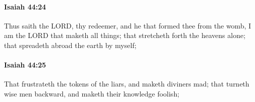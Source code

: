 		\paragraph{Isaiah 44:24} %
			\label{ISAIAH-44-24}

			Thus saith the LORD, thy redeemer, and he that formed thee from the womb, I am the LORD that maketh all things; that stretcheth forth the heavens alone; that spreadeth abroad the earth by myself;


		\paragraph{Isaiah 44:25} %
			\label{ISAIAH-44-25}

			That frustrateth the tokens of the liars, and maketh diviners mad; that turneth wise men backward, and maketh their knowledge foolish;


